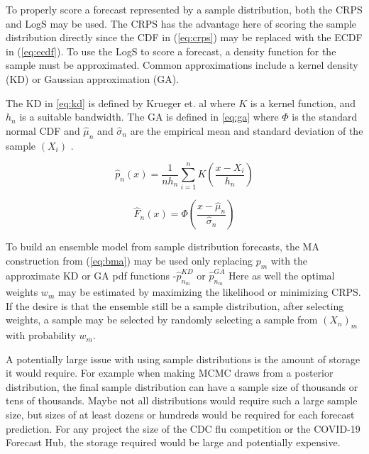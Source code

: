 \documentclass[11pt,notitlepage]{isuthesis}
\begin{document}
To properly score a forecast represented by a sample distribution, both the CRPS
and LogS may be used. The CRPS has the advantage here of scoring the sample 
distribution directly since the CDF in  (\ref{eq:crps}) may be replaced with the 
ECDF in
(\ref{eq:ecdf}). To use the LogS to score a forecast, a density function for the 
sample must be approximated. Common approximations include a kernel density (KD)
or Gaussian approximation (GA).

The KD in \eqref{eq:kd} is defined by Krueger et. al 
where $K$ is a kernel function, and $h_n$ is a suitable bandwidth. The GA is 
defined in \eqref{eq:ga} where $\Phi$ is the standard normal CDF and 
$\hat{\mu}_n$ and $\hat{\sigma}_n$
are the empirical mean and standard deviation of the sample $(X_i)$
\cite[see also for a comparison of scoring MCMC drawn forecasts between the CRPS 
and the LogS]{krueger2016probabilistic}.

\begin{equation}
\label{eq:kd}
  \hat{p}_n(x) = \frac{1}{n h_n} \sum_{i=1}^n K \left( \frac{x-X_i}{h_n} \right) 
\end{equation}

\begin{equation}
\label{eq:ga}
  \hat{F}_n(x) = \Phi  \left( \frac{x-\hat{\mu}_n}{\hat{\sigma}_n} \right)
\end{equation}




To build an ensemble model from sample distribution forecasts, the MA 
construction from (\ref{eq:bma}) may be used only replacing $p_m$ with the
approximate KD or GA pdf functions
-$\hat{p}_{n_m}^{KD}$ or $\hat{p}_{n_m}^{GA}$  
Here as well the optimal weights 
$w_m$ may be estimated by maximizing the likelihood or minimizing CRPS. 
If the desire is that the ensemble still be
a sample distribution, after selecting weights, a sample may be selected by 
randomly selecting a sample from $(X_n)_m$ with probability $w_m$.

A potentially large issue with using sample distributions is the amount of storage
it would require. For example when making MCMC draws from a posterior 
distribution, the final sample distribution can have a sample size of thousands
or tens of thousands. Maybe not all distributions would require such a large 
sample size, but sizes of at least dozens or hundreds would be required for each
forecast prediction. For any project the size of the CDC flu competition or the
COVID-19 Forecast Hub, the storage required would be large and potentially 
expensive.
\end{document}

